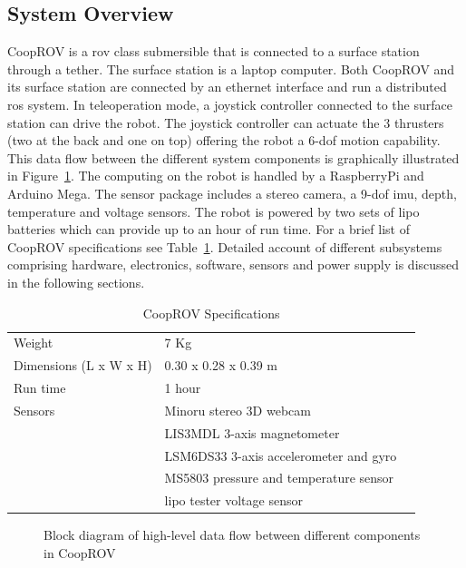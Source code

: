\documentclass {udthesis}
\begin{document}
\subsection{System Overview}

CoopROV is a \gls{rov} class submersible that is connected to a surface station through a tether. The surface station is a laptop computer. Both CoopROV and its surface station are connected by an ethernet interface and run a distributed \gls{ros} system. In teleoperation mode, a joystick controller connected to the surface station can drive the robot. The joystick controller can actuate the 3 thrusters (two at the back and one on top) offering the robot a 6-\gls{dof} motion capability. This data flow between the different system components is graphically illustrated in Figure~\ref{fig:cooprov_dataflow}. The computing on the robot is handled by a RaspberryPi\cite{raspberrypi} and Arduino Mega\cite{arduino}. The sensor package includes a stereo camera, a 9-\gls{dof} imu, depth, temperature and voltage sensors. The robot is powered by two sets of \gls{lipo} batteries which can provide up to an hour of run time. For a brief list of CoopROV specifications see Table~\ref{tab:cooprov_specs}. Detailed account of 
different subsystems comprising hardware, electronics, software, sensors and power supply is discussed in the following sections.
%
\begin{table}	\label{tab:cooprov_specs}
\caption{CoopROV Specifications}
  \begin{tabular}{lll} 
  \toprule
  Weight			&7 Kg\\
  Dimensions (L x W x H)	&0.30 x 0.28 x 0.39 m\\
  Run time			&1 hour\\
  Sensors			&Minoru stereo 3D webcam \\
				&LIS3MDL 3-axis magnetometer	\\
				&LSM6DS33 3-axis accelerometer and gyro\\
				&MS5803 pressure and temperature sensor\\
				&\gls{lipo} tester voltage sensor\\
  \bottomrule
  \end{tabular}
\end{table}
  
\begin{figure} \label{fig:cooprov_dataflow}
  \centering
\caption{Block diagram of high-level data flow between different components in CoopROV}
\end{figure}
\end{document}
